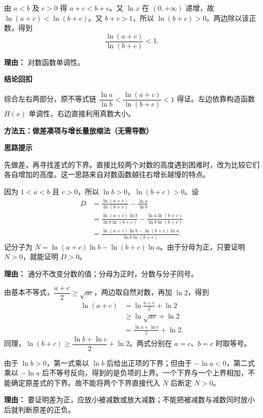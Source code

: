 \begin{proofbox}
\begin{description}[style=nextline, leftmargin=2.8em, labelsep=0.5em, itemsep=0.55em]
		\item[\textbf{步骤五（右边不等式）：}] 由 $a<b$ 及 $c>0$ 得 $a+c<b+c$。又 $\ln x$ 在 $(0,+\infty)$ 递增，故 $\ln(a+c)<\ln(b+c)$。又 $b+c>1$，所以 $\ln(b+c)>0$。两边除以该正数，得到
\[
\frac{\ln(a+c)}{\ln(b+c)}<1.
			\]
			\par\textbf{理由：} 对数函数单调性。
	\end{description}

	\medskip
	\textbf{\textcolor{CProof}{结论回扣}}

	综合左右两部分，原不等式链 $\dfrac{\ln a}{\ln b}<\dfrac{\ln(a+c)}{\ln(b+c)}<1$ 得证。左边依靠构造函数 $H(x)$ 单调性，右边直接利用真数大小。
\end{proofbox}

\noindent\textbf{方法五：做差凑项与增长量放缩法（无需导数）}
\begin{proofbox}
\textbf{\textcolor{CProof}{思路提示}}

先做差，再寻找差式的下界。直接比较两个对数的高度遇到困难时，改为比较它们各自增加的高度。这一思路来自对数函数越往右增长越慢的特点。

\begin{description}[style=nextline, leftmargin=2.8em, labelsep=0.5em, itemsep=0.55em]
\item[\textbf{步骤1（做差、通分）：}] 因为 $1<a<b$ 且 $c>0$，所以 $\ln b>0$，$\ln(b+c)>0$。设
\begin{align*}
D&=\frac{\ln(a+c)}{\ln(b+c)}-\frac{\ln a}{\ln b}\\
&=\frac{\ln(a+c)\ln b}{\ln b\ln(b+c)}-\frac{\ln a\ln(b+c)}{\ln b\ln(b+c)}\\
&=\frac{\ln(a+c)\ln b-\ln(b+c)\ln a}{\ln b\ln(b+c)}.
\end{align*}
记分子为 $N=\ln(a+c)\ln b-\ln(b+c)\ln a$。由于分母为正，只要证明 $N>0$，就能证明 $D>0$。
\par\textbf{理由：} 通分不改变分数的值；分母为正时，分数与分子同号。

\item[\textbf{步骤2（为什么直接利用中点性质放缩会卡住）：}] 由基本不等式，$\dfrac{a+c}{2}\geq\sqrt{ac}$，两边取自然对数，再加 $\ln2$，得到
\begin{align*}
\ln(a+c)&=\ln\frac{a+c}{2}+\ln2\\
&\geq\ln\sqrt{ac}+\ln2\\
&=\frac{\ln a+\ln c}{2}+\ln2.
\end{align*}
同理，$\ln(b+c)\geq\dfrac{\ln b+\ln c}{2}+\ln2$。两式分别在 $a=c$、$b=c$ 时取等号。

由于 $\ln b>0$，第一式乘以 $\ln b$ 后给出正项的下界；但由于 $-\ln a<0$，第二式乘以 $-\ln a$ 后不等号反向，得到的是负项的上界。一个下界与一个上界相加，不能确定原差式的下界。故不能将两个下界直接代入 $N$ 后断定 $N>0$。
\par\textbf{理由：} 要证明差为正，应放小被减数或放大减数；不能把被减数与减数同时放小后就判断原差的正负。


\end{description}
\end{proofbox}
